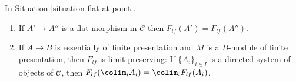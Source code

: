 \begin{lemma}
\label{lemma-flat-at-point}
In Situation \ref{situation-flat-at-point}.
\begin{enumerate}
\item If $A' \to A''$ is a flat morphism in $\mathcal{C}$
then $F_{lf}(A') = F_{lf}(A'')$.
\item If $A \to B$ is essentially of finite presentation and
$M$ is a $B$-module of finite presentation, then $F_{lf}$ is limit
preserving: If $\{A_i\}_{i \in I}$ is a
directed system of objects of $\mathcal{C}$, then
$F_{lf}(\colim_i A_i) = \colim_i F_{lf}(A_i)$.
\end{enumerate}
\end{lemma}